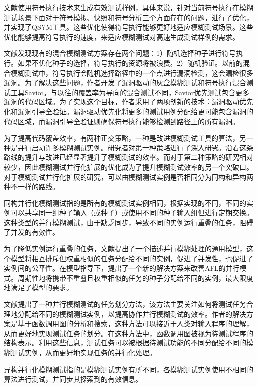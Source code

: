 \documentclass[master]{thesis-uestc}
\begin{document}
文献\cite{yun2018qsym}使用符号执行技术来生成有效测试样例，具体来说，针对当前符号执行在模糊测试场景下面对于符号模拟、快照和符号分析三个方面存在的问题，进行了优化，并实现了QSYM工具。这些优化使得符号执行能够更好地适应模糊测试场景。这些优化能够提高符号执行的速度，来适应模糊测试对高速生成测试样例的需求。

文献\cite{chen2020savior}发现现有的混合模糊测试方案存在两个问题：1）随机选择种子进行符号执行。如果不优化种子的选择，符号执行的资源将被浪费。2）随机验证。以前的混合模糊测试中，符号执行会随机选择路径中的一个点进行漏洞检测，这会漏检很多漏洞。为了解决这些问题，作者开发了漏洞驱动的灰盒模糊测试和符号执行混合测试工具Savior。与以往的覆盖率为导向的混合测试不同，Savior优先测试包含更多漏洞的代码区域。为了实现这个目标，作者采用了两项创新的技术：漏洞驱动优先化和漏洞引导全验证。漏洞驱动优先化将更多的测试用例分配给更可能包含漏洞的代码区域，而漏洞引导全验证则确保符号执行能够检测到路径上的所有漏洞。

为了提高代码覆盖效率，有两种正交策略，一种是改进模糊测试工具的算法，另一种是并行启动许多模糊测试实例。研究者对第一种策略进行了深入研究。沿着这条路线的提升与改进已经显著提升了模糊测试的效率。而对于第二种策略的研究相对较少，因此模糊测试并行化扩展的优化成为了提升模糊测试效率的另一个突破口。对于模糊测试并行化扩展的研究，可以由模糊测试实例是否相同分为同构和异构两种不一样的路线。

同构并行化模糊测试指的是所有的模糊测试实例相同，根据实现的不同，不同的实例可以共享同一组种子输入（或种子）或使用不同的种子输入组但进行定期交换。这种类型的并行模糊测试，由于缺乏同步，导致不同的实例运行重叠的任务，阻碍了并发的有效性。

为了降低实例运行重叠的任务，文献\cite{wang2021facilitating}提出了一个描述并行模糊处理的通用模型，这个模型将相互排斥但权重相似的任务分配给不同的实例，促进了并发性，也促进了实例间的公平性。在模型指导下，提出了一个新的解决方案来改善AFL的并行模式。周期性地将携带不重叠且权重相似的任务的种子分配给不同的实例，最大限度地满足了模型的要求。

文献\cite{pham2021towards}提出了一种并行模糊测试的任务划分方法，该方法主要关注如何将测试任务合理地分配给不同的模糊测试实例，以提高协作并行模糊测试的效率。作者的解决方案是基于函数调用图的分析和搜索，这种方法可以接近于人类对输入程序的理解，从而更好地实现测试任务的划分。在这种方法中，函数调用图被视为待测试程序的结构表示。利用这些信息，测试任务可以被根据待测试功能的不同分配给不同的模糊测试实例，从而更好地实现任务的并行化处理。

异构并行化模糊测试指的是模糊测试实例有所不同，各模糊测试实例使用不相同的算法进行测试，并同步其探索到的有效信息。
\end{document}
